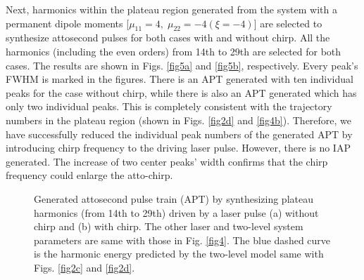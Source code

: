 \documentclass[10pt,letterpaper]{article}
\begin{document}
Next, harmonics within the plateau region generated from the system with a permanent dipole moments [$\mu_{11}=4,\;\mu_{22}=-4(\xi=-4)$]  are selected to synthesize attosecond pulses for both cases with and without chirp. All the harmonics (including the even orders) from 14th to 29th are selected for both cases. The results are shown in Figs. \ref{fig5a} and \ref{fig5b}, respectively. Every peak's FWHM is marked in the figures. There is an APT generated with ten individual peaks for the case without chirp, while there is also an APT generated which has only two individual peaks. This is completely consistent with the trajectory numbers in the plateau region (shown in Figs. \ref{fig2d} and \ref{fig4b}). Therefore, we have successfully reduced the individual peak numbers of the generated APT by introducing chirp frequency to the driving laser pulse. However, there is no IAP generated. The  increase of two center peaks' width confirms that the chirp frequency could enlarge the atto-chirp.
\begin{figure}[!htbp]
	\centering
	\caption{Generated attosecond pulse train (APT) by synthesizing plateau harmonics (from 14th to 29th) driven by a laser pulse (a) without chirp and (b) with chirp. The other laser and two-level system parameters are same with those in Fig. \ref{fig4}. The blue dashed curve is the harmonic energy predicted by the two-level model same with Figs. \ref{fig2c} and \ref{fig2d}.}
	\label{fig5}
\end{figure}
	
\end{document}
